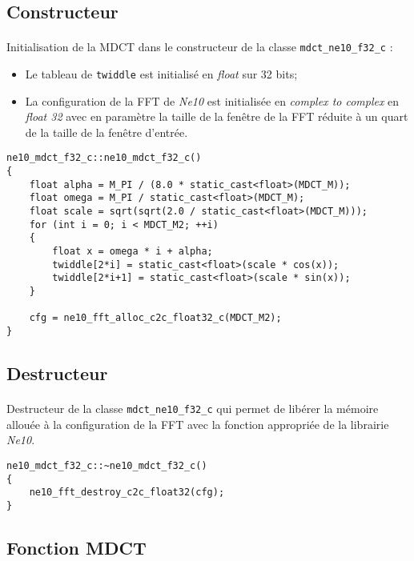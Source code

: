 \documentclass{article}
\begin{document}
\subsection{Constructeur}\label{app:mdct_ne10_f32_constructor}
\paragraph{}
Initialisation de la MDCT dans le constructeur de la classe \texttt{mdct\_ne10\_f32\_c} :
\begin{itemize}
    \item Le tableau de \texttt{twiddle} est initialisé en \emph{float} sur 32 bits;
    \item La configuration de la FFT de \emph{Ne10} est initialisée en \emph{complex to complex} en \emph{float 32} avec en paramètre la taille de la fenêtre de la FFT réduite à un quart de la taille de la fenêtre d'entrée.
\end{itemize}
\lstset{language=C++}
\begin{lstlisting}
ne10_mdct_f32_c::ne10_mdct_f32_c()
{
    float alpha = M_PI / (8.0 * static_cast<float>(MDCT_M));
    float omega = M_PI / static_cast<float>(MDCT_M);
    float scale = sqrt(sqrt(2.0 / static_cast<float>(MDCT_M)));
    for (int i = 0; i < MDCT_M2; ++i) 
    {
        float x = omega * i + alpha;
        twiddle[2*i] = static_cast<float>(scale * cos(x));
        twiddle[2*i+1] = static_cast<float>(scale * sin(x));
    }

    cfg = ne10_fft_alloc_c2c_float32_c(MDCT_M2);
}
\end{lstlisting}

\subsection{Destructeur}\label{app:mdct_ne10_f32_destructor}
\paragraph{}
Destructeur de la classe \texttt{mdct\_ne10\_f32\_c} qui permet de libérer la mémoire allouée à la configuration de la FFT avec la fonction appropriée de la librairie \emph{Ne10}.
\lstset{language=C++}
\begin{lstlisting}
ne10_mdct_f32_c::~ne10_mdct_f32_c()
{
    ne10_fft_destroy_c2c_float32(cfg);
}
\end{lstlisting}

\subsection{Fonction MDCT}\label{app:mdct_ne10_f32_func}
\end{document}
